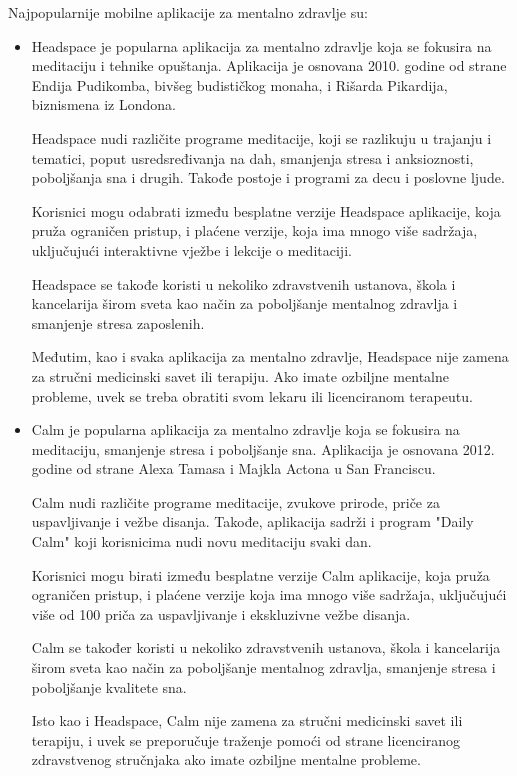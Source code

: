 \documentclass[a4paper]{article}
\begin{document}
Najpopularnije mobilne aplikacije za mentalno zdravlje su:
\begin{itemize}
\item Headspace je popularna aplikacija za mentalno zdravlje koja se fokusira na meditaciju i tehnike opuštanja. Aplikacija je osnovana 2010. godine od strane Endija Pudikomba, bivšeg budističkog monaha, i Rišarda Pikardija, biznismena iz Londona.

Headspace nudi različite programe meditacije, koji se razlikuju u trajanju i tematici, poput usredsređivanja na dah, smanjenja stresa i anksioznosti, poboljšanja sna i drugih. Takođe postoje i programi za decu i poslovne ljude.

Korisnici mogu odabrati između besplatne verzije Headspace aplikacije, koja pruža ograničen pristup, i plaćene verzije, koja ima mnogo više sadržaja, uključujući interaktivne vježbe i lekcije o meditaciji.

Headspace se takođe koristi u nekoliko zdravstvenih ustanova, škola i kancelarija širom sveta kao način za poboljšanje mentalnog zdravlja i smanjenje stresa zaposlenih.

Međutim, kao i svaka aplikacija za mentalno zdravlje, Headspace nije zamena za stručni medicinski savet ili terapiju. Ako imate ozbiljne mentalne probleme, uvek se treba obratiti svom lekaru ili licenciranom terapeutu.

\item Calm je popularna aplikacija za mentalno zdravlje koja se fokusira na meditaciju, smanjenje stresa i poboljšanje sna. Aplikacija je osnovana 2012. godine od strane Alexa Tamasa i Majkla Actona u San Franciscu.

Calm nudi različite programe meditacije, zvukove prirode, priče za uspavljivanje i vežbe disanja. Takođe, aplikacija sadrži i program "Daily Calm" koji korisnicima nudi novu meditaciju svaki dan.

Korisnici mogu birati između besplatne verzije Calm aplikacije, koja pruža ograničen pristup, i plaćene verzije koja ima mnogo više sadržaja, uključujući više od 100 priča za uspavljivanje i ekskluzivne vežbe disanja.

Calm se također koristi u nekoliko zdravstvenih ustanova, škola i kancelarija širom sveta kao način za poboljšanje mentalnog zdravlja, smanjenje stresa i poboljšanje kvalitete sna.

Isto kao i Headspace, Calm nije zamena za stručni medicinski savet ili terapiju, i uvek se preporučuje traženje pomoći od strane licenciranog zdravstvenog stručnjaka ako imate ozbiljne mentalne probleme.


\end{itemize}
\end{document}
